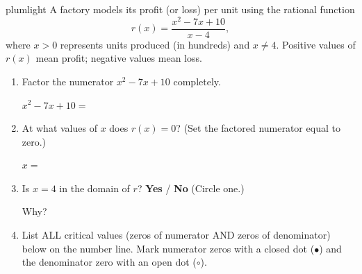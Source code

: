 \documentclass[10pt]{article}
\begin{document}
\namepartnerperiod

\vspace{0.10in}

\begin{scenariobox}{plumlight}
\small
A factory models its profit (or loss) per unit using the rational function
\[
  r(x) = \frac{x^2 - 7x + 10}{x - 4},
\]
where $x > 0$ represents units produced (in hundreds) and $x \ne 4$.
Positive values of $r(x)$ mean profit; negative values mean loss.
\end{scenariobox}

\vspace{0.08in}

\begin{tcolorbox}[colback=white, colframe=black!40,
    title=\textbf{Tier R --- Remediate},
    fonttitle=\bfseries, arc=2mm, left=3mm, right=3mm, top=2mm, bottom=2mm]

\begin{enumerate}[itemsep=10pt]

  \item Factor the numerator $x^2 - 7x + 10$ completely.

        $x^2 - 7x + 10 = $ \blank{6cm}

  \item At what values of $x$ does $r(x) = 0$? (Set the factored numerator equal to zero.)

        $x = $ \blank{5cm}

  \item Is $x = 4$ in the domain of $r$? \quad \textbf{Yes} \quad / \quad \textbf{No} \quad
        (Circle one.)

        Why? \blank{8cm}

  \item List ALL critical values (zeros of numerator AND zeros of denominator) below on the number line.
        Mark numerator zeros with a closed dot ($\bullet$) and the denominator zero with an open dot ($\circ$).

        \vspace{0.18in}
        \begin{center}
        \end{center}
\end{enumerate}
\end{tcolorbox}
\end{document}
